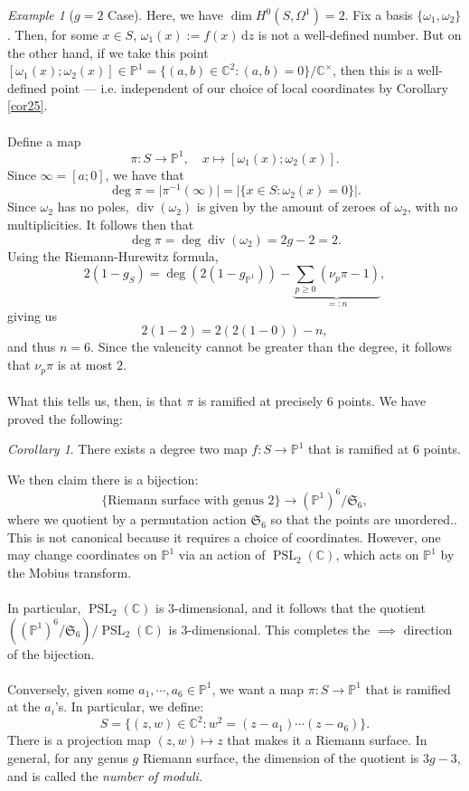 \documentclass[a4paper]{report}
\theoremstyle{definition}
\theoremstyle{remark}
\theoremstyle{proposition}
\theoremstyle{conjecture}
\theoremstyle{lemma}
\theoremstyle{corollary}
\newtheorem{corollary}{Corollary}
\theoremstyle{exercise}
\theoremstyle{example}
\newtheorem{example}{Example}
\newcommand{\C}{\mathbb{C}}
\newcommand{\diff}{\,\mathrm{d}}
\newcommand{\on}{\operatorname}
\begin{document}
\begin{example}[$g=2$ Case]
    Here, we have $\dim H^0(S,\Omega^1) = 2$. Fix a basis 
    $\lbrace \omega_1,\omega_2\rbrace$. Then, for some $x\in S$, 
    $\omega_1(x) := f(x)\diff z$ is not a well-defined number. But on the 
    other hand, if we take this point 
    $[\omega_1(x);\omega_2(x)] \in \mathbb{P}^1 = \lbrace (a,b)\in\C^2 : (a,b)=0\rbrace/\C^\times$, then this is a well-defined point --- i.e. independent 
    of our choice of local coordinates by Corollary \ref{cor25}.\\\\
    Define a map $$\pi : S \longrightarrow \mathbb{P}^1, \quad x \longmapsto [\omega_1(x);\omega_2(x)].$$
    Since $\infty = [a;0]$, we have that 
    $$\deg \pi = \vert \pi^{-1}(\infty)\vert = \left\vert \lbrace x \in S: \omega_2(x) = 0\rbrace\right\vert.$$
    Since $\omega_2$ has no poles, $\on{div}(\omega_2)$ is given by the amount
    of zeroes of $\omega_2$, with no multiplicities.
    It follows then that 
    $$\deg \pi = \deg \on{div}(\omega_2) = 2g-2 = 2.$$
    Using the Riemann-Hurewitz formula, $$2(1-g_S) = \deg(2(1-g_{\mathbb{P}^1})) - \underbrace{\sum_{p\geq 0} (\nu_p\pi - 1)}_{=:n},$$
    giving us 
    $$2(1-2) = 2(2(1-0)) - n,$$ and thus $n = 6$.
    Since the valencity cannot be greater than the degree, it follows that 
    $\nu_p\pi$ is at most $2$.\\\\
    What this tells us, then, is that $\pi$ is ramified at precisely $6$ points.
    We have proved the following:
    \begin{corollary}
        There exists a degree two map $f : S \to \mathbb{P}^1$ that is ramified
        at $6$ points.
    \end{corollary}
    We then claim there is a bijection: $$\lbrace \text{Riemann surface with genus $2$}\rbrace \longrightarrow (\mathbb{P}^1)^6/\mathfrak{S}_6,$$
    where we quotient by a permutation action $\mathfrak{S}_6$ so that the 
    points are unordered..
    This is not canonical because it requires a choice of coordinates.
    However, one may change coordinates on $\mathbb{P}^1$ via an action
    of $\on{PSL}_2(\C)$, which acts on $\mathbb{P}^1$ by the Mobius
    transform.\\\\
    In particular, $\on{PSL}_2(\C)$ is $3$-dimensional,
    and it follows that the quotient $\left((\mathbb{P}^1)^6/\mathfrak{S}_6\right)/\on{PSL}_2(\C)$ is $3$-dimensional. This completes the $\implies$ direction of the bijection.\\\\
    Conversely, given some $a_1,\cdots,a_6\in\mathbb{P}^1$, we want a map 
    $\pi : S \to \mathbb{P}^1$ that is ramified at the $a_i$'s.
    In particular, we define:
    $$S = \lbrace (z,w)\in \C^2 : w^2 = (z-a_1)\cdots(z-a_6)\rbrace.$$
    There is a projection map $(z,w) \mapsto z$ that makes it a Riemann
    surface.
    In general, for any genus $g$ Riemann surface,
    the dimension of the quotient is $3g-3$, and is called the \emph{number of 
    moduli}.
\end{example}
\end{document}
